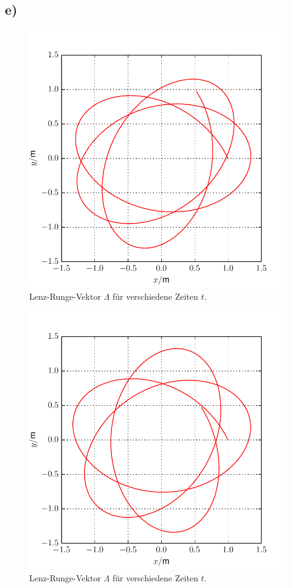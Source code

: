 \subsection*{e)}

\begin{figure}[H]
	\centering
	\includegraphics[width = \textwidth]{../Plots/Plot_4_E_1.pdf}
	\caption{Lenz-Runge-Vektor $\Lambda$ für verschiedene Zeiten $t$.\label{fig:E1}}
\end{figure}

\begin{figure}[H]
	\centering
	\includegraphics[width = \textwidth]{../Plots/Plot_4_E_2.pdf}
	\caption{Lenz-Runge-Vektor $\Lambda$ für verschiedene Zeiten $t$.\label{fig:E2}}
\end{figure}
